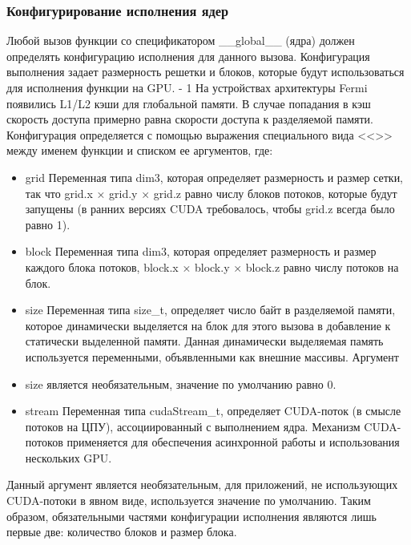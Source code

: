 \documentclass[a4paper, 12pt]{article}
\begin{document}
 \subsubsection{Конфигурирование исполнения ядер}
Любой вызов функции со 
спецификатором \_\_global\_\_ (ядра) должен определять конфигурацию 
исполнения для данного вызова. Конфигурация выполнения задает 
размерность решетки и блоков, которые будут использоваться для 
исполнения функции на GPU. - 1 На устройствах архитектуры Fermi появились 
L1/L2 кэши для глобальной памяти. В случае попадания в кэш скорость 
доступа примерно равна скорости доступа к разделяемой памяти. 
Конфигурация определяется с помощью выражения специального вида <<>> 
между именем функции и списком ее аргументов, где:
\begin{itemize}
\item grid Переменная типа dim3, которая определяет размерность и размер 
сетки, так что grid.x × grid.y × grid.z равно числу блоков потоков, которые 
будут запущены (в ранних версиях CUDA требовалось, чтобы grid.z всегда 
было равно 1).
\item block Переменная типа dim3, которая определяет размерность и размер 
каждого блока потоков, block.x × block.y × block.z равно числу потоков на 
блок. 
\item size Переменная типа size\_t, определяет число байт в разделяемой памяти, 
которое динамически выделяется на блок для этого вызова в добавление к 
статически выделенной памяти. Данная динамически выделяемая память 
используется переменными, объявленными как внешние массивы. Аргумент 
\item size является необязательным, значение по умолчанию равно 0.
\item stream Переменная типа cudaStream\_t, определяет CUDA-поток (в смысле 
потоков на ЦПУ), ассоциированный с выполнением ядра. Механизм CUDA-
потоков применяется для обеспечения асинхронной работы и использования 
нескольких GPU.
\end{itemize}
 Данный аргумент является необязательным, для приложений, не 
использующих CUDA-потоки в явном виде, используется значение по 
умолчанию. 
Таким образом, обязательными частями конфигурации исполнения являются 
лишь первые две: количество блоков и размер блока.
\end{document}

